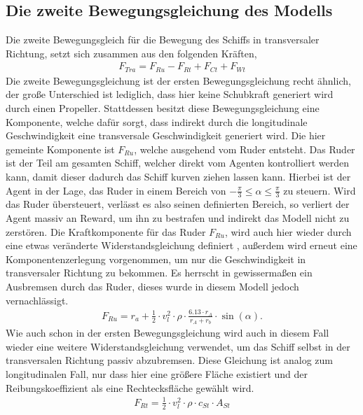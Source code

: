 \documentclass[]{iat}
\begin{document}
\subsection{Die zweite Bewegungsgleichung des Modells} \label{sec:eom2}
Die zweite Bewegungsgleich für die Bewegung des Schiffs in transversaler Richtung, setzt sich zusammen aus den folgenden Kräften,
\begin{align}
    F_{Tra} = F_{Ru} - F_{Rt} + F_{Ct} + F_{Wt}
\end{align}
Die zweite Bewegungsgleichung ist der ersten Bewegungsgleichung recht ähnlich, der große Unterschied ist lediglich, dass hier keine Schubkraft generiert wird durch einen Propeller. Stattdessen besitzt diese Bewegungsgleichung eine Komponente, welche dafür sorgt, dass indirekt durch die longitudinale Geschwindigkeit eine transversale Geschwindigkeit generiert wird. Die hier gemeinte Komponente ist $F_{Ru}$, welche ausgehend vom Ruder entsteht. Das Ruder ist der Teil am gesamten Schiff, welcher direkt vom Agenten kontrolliert werden kann, damit dieser dadurch das Schiff kurven ziehen lassen kann. Hierbei ist der Agent in der Lage, das Ruder in einem Bereich von $-\frac{\pi}{3} \leq \alpha \leq \frac{\pi}{3}$ zu steuern. Wird das Ruder übersteuert, verlässt es also seinen definierten Bereich, so verliert der Agent massiv an Reward, um ihn zu bestrafen und indirekt das Modell nicht zu zerstören. Die Kraftkomponente für das Ruder $F_{Ru}$, wird auch hier wieder durch eine etwas veränderte Widerstandsgleichung definiert \cite[]{Kulczyk_Tabaczek_2014_2}, außerdem wird erneut eine Komponentenzerlegung vorgenommen, um nur die Geschwindigkeit in transversaler Richtung zu bekommen. Es herrscht in gewissermaßen ein Ausbremsen durch das Ruder, dieses wurde in diesem Modell jedoch vernachlässigt.
\begin{align}
    F_{Ru} = r_a + \frac{1}{2} \cdot v_l^2 \cdot \rho \cdot \frac{6.13 \cdot r_A}{r_A + r_b} \cdot \sin(\alpha). \label{eq:rudder_resistance_long}
\end{align}
Wie auch schon in der ersten Bewegungsgleichung wird auch in diesem Fall wieder eine weitere Widerstandsgleichung verwendet, um das Schiff selbst in der transversalen Richtung passiv abzubremsen. Diese Gleichung ist analog zum longitudinalen Fall, nur dass hier eine größere Fläche existiert und der Reibungskoeffizient als eine Rechtecksfläche gewählt wird.
\begin{align}
    F_{Rt} = \frac{1}{2} \cdot v_l^2 \cdot \rho \cdot c_{St} \cdot A_{St} \label{eq:side_resistance}
\end{align}
\end{document}
